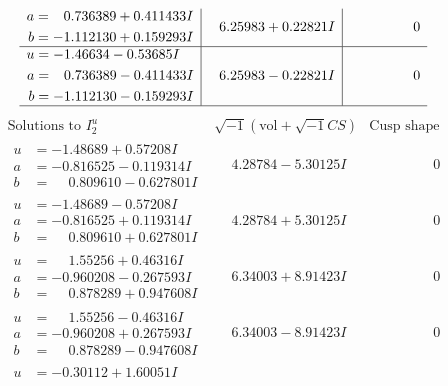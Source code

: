 \documentclass[1p]{elsarticle_modified}
\theoremstyle{definition}
\newcommand{\I}{\sqrt{-1}}
\begin{document}
$$\begin{array}{c|c|c}
\begin{aligned}
a &= \phantom{-}0.736389 + 0.411433 I \\
b &= -1.112130 + 0.159293 I\end{aligned}
 & \phantom{-}6.25983 + 0.22821 I & \phantom{-0.000000 } 0 \\ \hline\begin{aligned}
u &= -1.46634 - 0.53685 I \\
a &= \phantom{-}0.736389 - 0.411433 I \\
b &= -1.112130 - 0.159293 I\end{aligned}
 & \phantom{-}6.25983 - 0.22821 I & \phantom{-0.000000 } 0\\
 \hline 
 \end{array}$$\newpage$$\begin{array}{c|c|c}  
\text{Solutions to }I^u_{2}& \I (\text{vol} + \sqrt{-1}CS) & \text{Cusp shape}\\
 \hline 
\begin{aligned}
u &= -1.48689 + 0.57208 I \\
a &= -0.816525 - 0.119314 I \\
b &= \phantom{-}0.809610 - 0.627801 I\end{aligned}
 & \phantom{-}4.28784 - 5.30125 I & \phantom{-0.000000 } 0 \\ \hline\begin{aligned}
u &= -1.48689 - 0.57208 I \\
a &= -0.816525 + 0.119314 I \\
b &= \phantom{-}0.809610 + 0.627801 I\end{aligned}
 & \phantom{-}4.28784 + 5.30125 I & \phantom{-0.000000 } 0 \\ \hline\begin{aligned}
u &= \phantom{-}1.55256 + 0.46316 I \\
a &= -0.960208 - 0.267593 I \\
b &= \phantom{-}0.878289 + 0.947608 I\end{aligned}
 & \phantom{-}6.34003 + 8.91423 I & \phantom{-0.000000 } 0 \\ \hline\begin{aligned}
u &= \phantom{-}1.55256 - 0.46316 I \\
a &= -0.960208 + 0.267593 I \\
b &= \phantom{-}0.878289 - 0.947608 I\end{aligned}
 & \phantom{-}6.34003 - 8.91423 I & \phantom{-0.000000 } 0 \\ \hline\begin{aligned}
u &= -0.30112 + 1.60051 I \\

\end{aligned}
\end{array}$$
\end{document}
